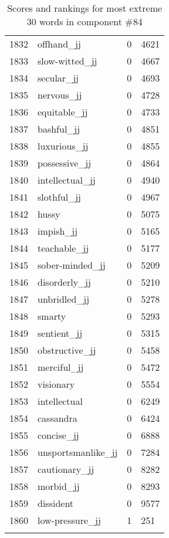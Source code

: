 \begin{longtable}[!htbp]{| rlr@{.}l |}
    1832 & offhand\_jj & 0 & 4621 \\
    1833 & slow-witted\_jj & 0 & 4667 \\
    1834 & secular\_jj & 0 & 4693 \\
    1835 & nervous\_jj & 0 & 4728 \\
    1836 & equitable\_jj & 0 & 4733 \\
    1837 & bashful\_jj & 0 & 4851 \\
    1838 & luxurious\_jj & 0 & 4855 \\
    1839 & possessive\_jj & 0 & 4864 \\
    1840 & intellectual\_jj & 0 & 4940 \\
    1841 & slothful\_jj & 0 & 4967 \\
    1842 & hussy & 0 & 5075 \\
    1843 & impish\_jj & 0 & 5165 \\
    1844 & teachable\_jj & 0 & 5177 \\
    1845 & sober-minded\_jj & 0 & 5209 \\
    1846 & disorderly\_jj & 0 & 5210 \\
    1847 & unbridled\_jj & 0 & 5278 \\
    1848 & smarty & 0 & 5293 \\
    1849 & sentient\_jj & 0 & 5315 \\
    1850 & obstructive\_jj & 0 & 5458 \\
    1851 & merciful\_jj & 0 & 5472 \\
    1852 & visionary & 0 & 5554 \\
    1853 & intellectual & 0 & 6249 \\
    1854 & cassandra & 0 & 6424 \\
    1855 & concise\_jj & 0 & 6888 \\
    1856 & unsportsmanlike\_jj & 0 & 7284 \\
    1857 & cautionary\_jj & 0 & 8282 \\
    1858 & morbid\_jj & 0 & 8293 \\
    1859 & dissident & 0 & 9577 \\
    1860 & low-pressure\_jj & 1 & 251 \\
    \hline
    \caption{Scores and rankings for most extreme 30 words in component \#84} \\
\end{longtable}
